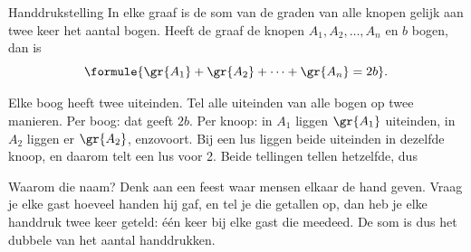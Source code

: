 \begin{theorie}
\begin{stelling}{Handdrukstelling}
In elke graaf is de som van de graden van alle knopen gelijk aan twee keer het aantal bogen. Heeft de graaf de knopen $A_1, A_2, \ldots, A_n$ en $b$ bogen, dan is
\[ \formule{\gr{A_1} + \gr{A_2} + \cdots + \gr{A_n} = 2b} . \]
\end{stelling}
\begin{bewijs}
Elke boog heeft twee uiteinden. Tel alle uiteinden van alle bogen op twee manieren. Per boog: dat geeft $2b$. Per knoop: in $A_1$ liggen $\gr{A_1}$ uiteinden, in $A_2$ liggen er $\gr{A_2}$, enzovoort. Bij een lus liggen beide uiteinden in dezelfde knoop, en daarom telt een lus voor 2. Beide tellingen tellen hetzelfde, dus
\end{bewijs}
\end{theorie}

Waarom die naam? Denk aan een feest waar mensen elkaar de hand geven. Vraag je elke gast hoeveel handen hij gaf, en tel je die getallen op, dan heb je elke handdruk twee keer geteld: één keer bij elke gast die meedeed. De som is dus het dubbele van het aantal handdrukken.


\begin{oefeningen}
\end{oefeningen}

